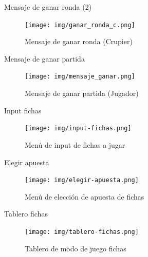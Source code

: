 \begin{frame}{Mensaje de ganar ronda (2)}
    \begin{figure}
        \centering
        \texttt{[image: img/ganar\_ronda\_c.png]}
        \caption{Mensaje de ganar ronda (Crupier)}
        \label{fig:enter-label}
    \end{figure}
\end{frame}

\begin{frame}{Mensaje de ganar partida}
    \begin{figure}
        \centering
        \texttt{[image: img/mensaje\_ganar.png]}
        \caption{Mensaje de ganar partida (Jugador)}
        \label{fig:enter-label}
    \end{figure}
\end{frame}

\begin{frame}{Input fichas}
    \begin{figure}
        \centering
        \texttt{[image: img/input-fichas.png]}
        \caption{Menú de input de fichas a jugar}
        \label{fig:input-fichas}
    \end{figure}
\end{frame}

\begin{frame}{Elegir apuesta}
    \begin{figure}
        \centering
        \texttt{[image: img/elegir-apuesta.png]}
        \caption{Menú de elección de apuesta de fichas}
        \label{fig:elegir-apuesta}
    \end{figure}
\end{frame}

\begin{frame}{Tablero fichas}
    \begin{figure}
        \centering
        \texttt{[image: img/tablero-fichas.png]}
        \caption{Tablero de modo de juego fichas}
        \label{fig:fichas-tablero}
    \end{figure}
\end{frame}
